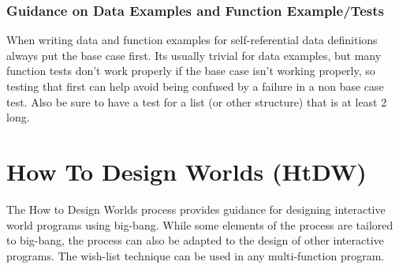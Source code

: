 \documentclass[11pt,a4paper]{report}
\begin{document}
	\subsection*{Guidance on Data Examples and Function Example/Tests}
	When writing data and function examples for self-referential data definitions always put the base
	case first. Its usually trivial for data examples, but many function tests don't work properly if the
	base case isn't working properly, so testing that first can help avoid being confused by a failure in
	a non base case test. Also be sure to have a test for a list (or other structure) that is at least 2
	long.
	
	\chapter{How To Design Worlds (HtDW)} \label{ch:htdw}
	The How to Design Worlds process provides guidance for designing interactive world programs
	using big-bang. While some elements of the process are tailored to big-bang, the process can
	also be adapted to the design of other interactive programs. The wish-list technique can be used
	in any multi-function program.
	\\ \\
	\pagebreak
\end{document}
